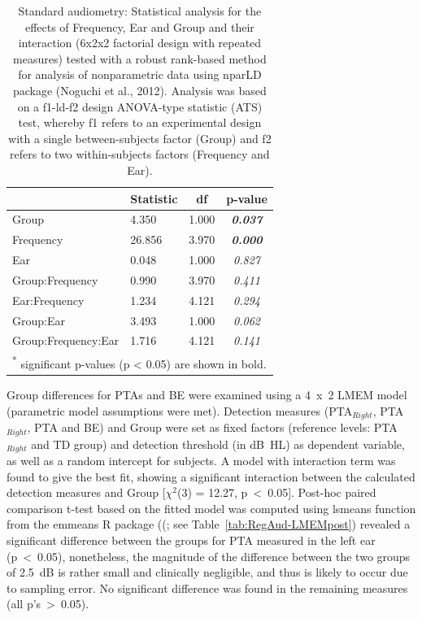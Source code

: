 \documentclass[a4paper, twoside]{templates/ociamthesis}
\begin{document}
\begin{table}

\caption{\label{tab:RegAud-TabnparLD}Standard audiometry: Statistical analysis for the effects of Frequency, Ear and Group and their interaction (6x2x2 factorial design with repeated measures) tested with a robust rank-based method for analysis of nonparametric data using nparLD package (Noguchi et al., 2012). Analysis was based on a f1-ld-f2 design ANOVA-type statistic (ATS) test, whereby f1 refers to an experimental design with a single between-subjects factor (Group) and f2 refers to two within-subjects factors (Frequency and Ear).}
\centering
\begin{tabular}[t]{llc>{}c}
\toprule
  & Statistic & df & p-value\\
\midrule
Group & 4.350 & 1.000 & \em{\textbf{0.037}}\\
Frequency & 26.856 & 3.970 & \em{\textbf{0.000}}\\
Ear & 0.048 & 1.000 & \em{0.827}\\
Group:Frequency & 0.990 & 3.970 & \em{0.411}\\
Ear:Frequency & 1.234 & 4.121 & \em{0.294}\\
Group:Ear & 3.493 & 1.000 & \em{0.062}\\
Group:Frequency:Ear & 1.716 & 4.121 & \em{0.141}\\
\bottomrule
\multicolumn{4}{l}{\textsuperscript{*} significant p-values (p < 0.05) are shown in bold.}\\
\end{tabular}
\end{table}

Group differences for PTAs and BE were examined using a 4~x~2 LMEM model (parametric model assumptions were met). Detection measures (PTA\(_{Right}\), PTA\(_{Right}\), PTA and BE) and Group were set as fixed factors (reference levels: PTA\(_{Right}\) and TD group) and detection threshold (in dB~HL) as dependent variable, as well as a random intercept for subjects. A model with interaction term was found to give the best fit, showing a significant interaction between the calculated detection measures and Group {[}\(\chi^2\)(3) = 12.27, p~\textless~0.05{]}. Post-hoc paired comparison t-test based on the fitted model was computed using lsmeans function from the emmeans R package ((\textcite{emmeansPackageR}; see Table~\ref{tab:RegAud-LMEMpost}) revealed a significant difference between the groups for PTA measured in the left ear (p~\textless~0.05), nonetheless, the magnitude of the difference between the two groups of 2.5~dB is rather small and clinically negligible, and thus is likely to occur due to sampling error. No significant difference was found in the remaining measures (all p's~\textgreater~0.05).\\
\end{document}
